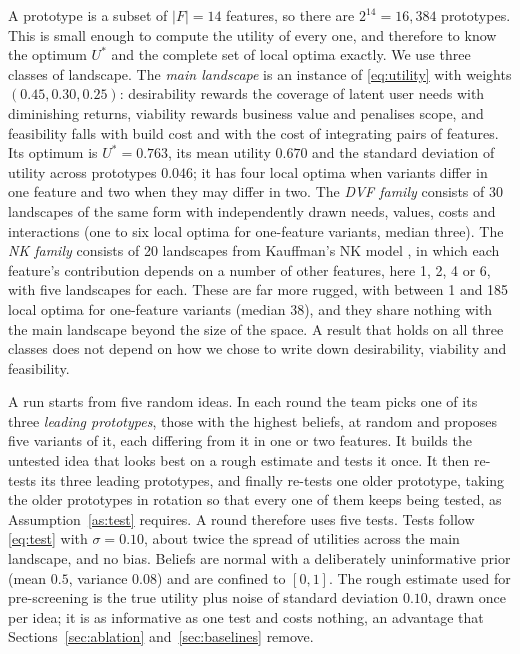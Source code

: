 \documentclass[10pt,twocolumn]{article}
\theoremstyle{definition}
\begin{document}
A prototype is a subset of $|F|=14$ features, so there are $2^{14}=16{,}384$ prototypes. This is small enough to compute the utility of every one, and therefore to know the optimum $U^*$ and the complete set of local optima exactly. We use three classes of landscape. The \emph{main landscape} is an instance of \eqref{eq:utility} with weights $(0.45,0.30,0.25)$: desirability rewards the coverage of latent user needs with diminishing returns, viability rewards business value and penalises scope, and feasibility falls with build cost and with the cost of integrating pairs of features. Its optimum is $U^*=0.763$, its mean utility $0.670$ and the standard deviation of utility across prototypes $0.046$; it has four local optima when variants differ in one feature and two when they may differ in two. The \emph{DVF family} consists of 30 landscapes of the same form with independently drawn needs, values, costs and interactions (one to six local optima for one-feature variants, median three). The \emph{NK family} consists of 20 landscapes from Kauffman's NK model \citep{kauffman1993}, in which each feature's contribution depends on a number of other features, here 1, 2, 4 or 6, with five landscapes for each. These are far more rugged, with between 1 and 185 local optima for one-feature variants (median 38), and they share nothing with the main landscape beyond the size of the space. A result that holds on all three classes does not depend on how we chose to write down desirability, viability and feasibility.

A run starts from five random ideas. In each round the team picks one of its three \emph{leading prototypes}, those with the highest beliefs, at random and proposes five variants of it, each differing from it in one or two features. It builds the untested idea that looks best on a rough estimate and tests it once. It then re-tests its three leading prototypes, and finally re-tests one older prototype, taking the older prototypes in rotation so that every one of them keeps being tested, as Assumption~\ref{as:test} requires. A round therefore uses five tests. Tests follow \eqref{eq:test} with $\sigma=0.10$, about twice the spread of utilities across the main landscape, and no bias. Beliefs are normal with a deliberately uninformative prior (mean $0.5$, variance $0.08$) and are confined to $[0,1]$. The rough estimate used for pre-screening is the true utility plus noise of standard deviation $0.10$, drawn once per idea; it is as informative as one test and costs nothing, an advantage that Sections~\ref{sec:ablation} and~\ref{sec:baselines} remove.
\end{document}
